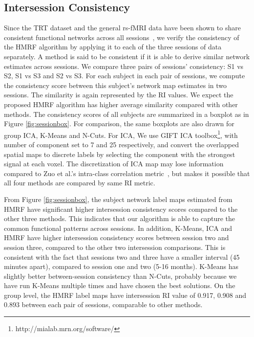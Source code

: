 \documentclass[review,authoryear]{elsarticle}
\begin{document}
\subsection{Intersession Consistency}
Since the TRT dataset and the general rs-fMRI data have been shown to share
consistent functional networks across all
sessions~\citep{damoiseaux2006consistent, chen2008group, meindl2010test,
  franco2009interrater}, we verify the consistency of the HMRF algorithm by
applying it to each of the three sessions of data separately.  A method is said
to be consistent if it is able to derive similar network estimates across
sessions.  We compare three pairs of sessions' consistency: S1 vs S2, S1 vs S3
and S2 vs S3. For each subject in each pair of sessions, we compute the
consistency score between this subject's network map estimates in two
sessions. The similarity is again represented by the RI values. We expect the
proposed HMRF algorithm has higher average similarity compared with other
methods. The consistency scores of all subjects are summarized in a boxplot as
in Figure \ref{fig:sessionbox}. For comparison, the same boxplots are also drawn
for group ICA, K-Means and N-Cuts. For ICA, We use GIFT ICA
toolbox\footnote{http://mialab.mrn.org/software/}, with number of component set
to 7 and 25 respectively, and convert the overlapped spatial maps to discrete
labels by selecting the component with the strongest signal at each voxel. The
discretization of ICA map may lose information compared to Zuo et al.'s
intra-class correlation metric~\citep{zuo2010reliable}, but makes it possible
that all four methods are compared by same RI metric.

From Figure \ref{fig:sessionbox}, the subject network label maps estimated from
HMRF have significant higher intersession consistency scores compared to the
other three methods. This indicates that our algorithm is able to capture the
common functional patterns across sessions. In addition, K-Means, ICA and HMRF
have higher intersession consistency scores between session two and session
three, compared to the other two intersession comparisons. This is consistent
with the fact that sessions two and three have a smaller interval (45 minutes
apart), compared to session one and two (5-16 months). K-Means has slightly
better between-session consistency than N-Cuts, probably because we have run
K-Means multiple times and have chosen the best solutions. On the group level,
the HMRF label maps have intersession RI value of 0.917, 0.908 and 0.893 between
each pair of sessions, comparable to other methods.
\end{document}
